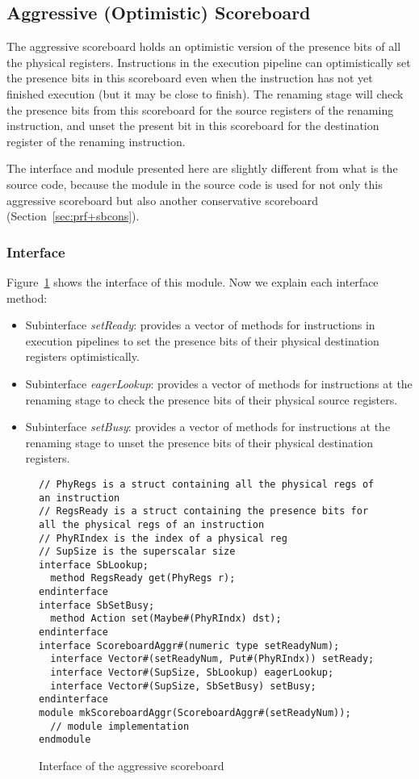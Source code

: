 \subsection{Aggressive (Optimistic) Scoreboard}\label{sec:sbaggr}

The aggressive scoreboard holds an optimistic version of the presence bits of all the physical registers.
Instructions in the execution pipeline can optimistically set the presence bits in this scoreboard even when the instruction has not yet finished execution (but it may be close to finish).
The renaming stage will check the presence bits from this scoreboard for the source registers of the renaming instruction, and unset the present bit in this scoreboard for the destination register of the renaming instruction.

The interface and module presented here are slightly different from what is the source code, because the module in the source code is used for not only this aggressive scoreboard but also another conservative scoreboard (Section~\ref{sec:prf+sbcons}).

\subsubsection{Interface}
Figure~\ref{fig:aggr-sb-ifc} shows the interface of this module.
Now we explain each interface method: 
\begin{itemize}
    \item Subinterface \emph{setReady}: provides a vector of methods for instructions in execution pipelines to set the presence bits of their physical destination registers optimistically.
    \item Subinterface \emph{eagerLookup}: provides a vector of methods for instructions at the renaming stage to check the presence bits of their physical source registers.
    \item Subinterface \emph{setBusy}: provides a vector of methods for instructions at the renaming stage to unset the presence bits of their physical destination registers.
\end{itemize}

\begin{figure}[!htb]
\begin{lstlisting}[caption={}]
// PhyRegs is a struct containing all the physical regs of an instruction
// RegsReady is a struct containing the presence bits for all the physical regs of an instruction
// PhyRIndex is the index of a physical reg
// SupSize is the superscalar size
interface SbLookup;
  method RegsReady get(PhyRegs r);
endinterface
interface SbSetBusy;
  method Action set(Maybe#(PhyRIndx) dst);
endinterface
interface ScoreboardAggr#(numeric type setReadyNum);
  interface Vector#(setReadyNum, Put#(PhyRIndx)) setReady;
  interface Vector#(SupSize, SbLookup) eagerLookup;
  interface Vector#(SupSize, SbSetBusy) setBusy;
endinterface
module mkScoreboardAggr(ScoreboardAggr#(setReadyNum));
  // module implementation
endmodule
\end{lstlisting}
\caption{Interface of the aggressive scoreboard}\label{fig:aggr-sb-ifc}
\end{figure}

